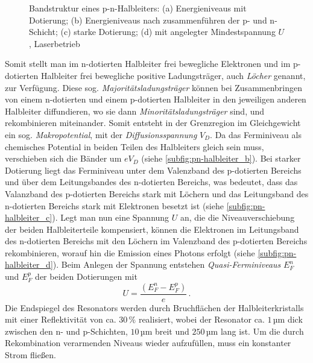 \begin{figure}[h]
{{{	  	}
	}}
	\caption[Bandstruktur Halbleiterlaser]{Bandstruktur eines p-n-Halbleiters: (a)
	Energieniveaus mit Dotierung; (b) Energieniveaus nach
	zusammenführen der p- und n-Schicht; (c) starke
	Dotierung; (d) mit angelegter Mindestspannung $U$,
	Laserbetrieb}\label{fig:pn-halbleiter}
\end{figure}
Somit stellt
man im n-dotierten Halbleiter frei bewegliche Elektronen und im p-dotierten Halbleiter frei bewegliche positive
Ladungsträger, auch \textit{Löcher} genannt, zur Verfügung. Diese sog.
\textit{Majoritätsladungsträger} können bei Zusammenbringen von einem
n-dotierten und einem p-dotierten Halbleiter in den jeweiligen anderen
Halbleiter diffundieren, wo sie dann \textit{Minoritätsladungsträger} sind, und
rekombinieren miteinander. Somit entsteht in der Grenzregion im Gleichgewicht
ein sog. \textit{Makropotential}, mit der \textit{Diffusionsspannung} $V_D$. Da
das Ferminiveau als chemisches Potential in beiden Teilen des Halbleiters gleich
sein muss, verschieben sich die Bänder um $eV_D$ (siehe
\ref{subfig:pn-halbleiter_b}). Bei starker Dotierung liegt das Ferminiveau unter
dem Valenzband des p-dotierten Bereichs und über dem Leitungsbandes des
n-dotierten Bereichs, was bedeutet, dass das Valanzband des p-dotierten Bereichs
stark mit Löchern und das Leitungsband des n-dotierten Bereichs stark mit
Elektronen besetzt ist (siehe \ref{subfig:pn-halbleiter_c}). Legt man nun eine
Spannung $U$ an, die die Niveauverschiebung der beiden Halbleiterteile
kompensiert, können die Elektronen im Leitungsband des n-dotierten Bereichs mit
den Löchern im Valenzband des p-dotierten Bereichs rekombinieren, worauf hin
die Emission eines Photons erfolgt (siehe \ref{subfig:pn-halbleiter_d}). Beim
Anlegen der Spannung entstehen \textit{Quasi-Ferminiveaus} $E_F^n$ und $E_F^p$
der beiden Dotierungen mit
\begin{equation}\label{eq:quasi-ferminiveaus}
	U=\frac{\left(E_F^n-E_F^p\right)}{e}\,.
\end{equation}
Die Endspiegel des Resonators werden durch Bruchflächen der Halbleiterkristalls
mit einer Reflektivität von ca. $30\,\%$ realisiert, wobei der Resonator ca.
$1\,$µm dick zwischen den n- und p-Schichten, $10\,$µm breit und $250\,$µm
lang ist. Um die durch
Rekombination verarmenden Niveaus wieder aufzufüllen, muss ein konstanter Strom
fließen.

